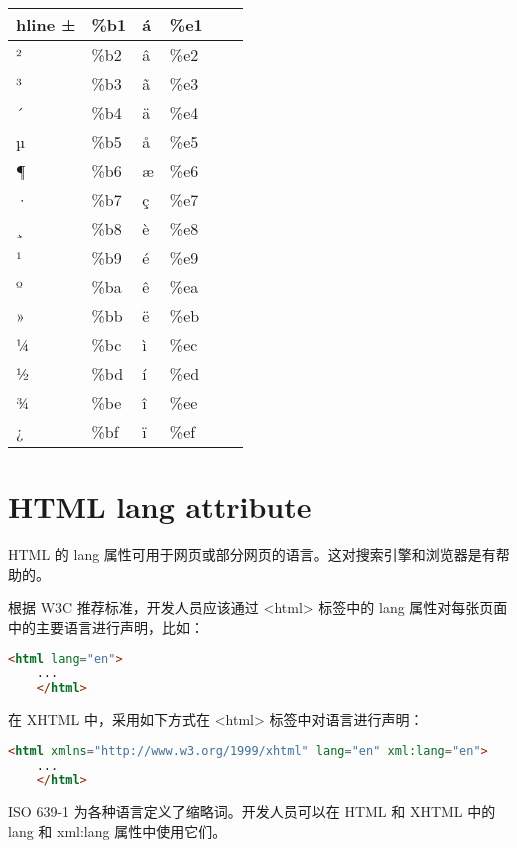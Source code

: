 \begin{longtable}{|l|l|l|l|l|l|}
hline	 	 
±			&\%b1		&á			&\%e1	 	 &			&			\\
\hline
²			&\%b2		&â			&\%e2	 	 &			&			\\
\hline
³			&\%b3		&ã			&\%e3	 	 &			&			\\
\hline
´			&\%b4		&ä			&\%e4		&			&			\\
\hline	 	 
µ			&\%b5		&å			&\%e5	 	 &			&			\\
\hline
¶			&\%b6		&æ			&\%e6		&			&			\\
\hline	 	 
·			&\%b7		&ç			&\%e7	 	 &			&			\\
\hline
¸			&\%b8		&è			&\%e8		&			&			\\
\hline	 	 
¹			&\%b9		&é			&\%e9	 	 &			&			\\
\hline
º			&\%ba		&ê			&\%ea	 	 &			&			\\
\hline
»			&\%bb		&ë			&\%eb	 	 &			&			\\
\hline
¼			&\%bc		&ì			&\%ec	 	 &			&			\\
\hline
½			&\%bd		&í			&\%ed		&			&			\\
\hline 	 
¾			&\%be		&î			&\%ee		&			&			\\
\hline	 	 
¿			&\%bf		&ï			&\%ef		&			&			\\ 	 
\hline
\end{longtable}


\chapter{HTML lang attribute}


HTML 的 lang 属性可用于网页或部分网页的语言。这对搜索引擎和浏览器是有帮助的。

根据 W3C 推荐标准，开发人员应该通过 <html> 标签中的 lang 属性对每张页面中的主要语言进行声明，比如：

\begin{lstlisting}[language=HTML]
    <html lang="en">
    ...
    </html>
\end{lstlisting}



在 XHTML 中，采用如下方式在 <html> 标签中对语言进行声明：

\begin{lstlisting}[language=HTML]
    <html xmlns="http://www.w3.org/1999/xhtml" lang="en" xml:lang="en">
    ...
    </html>
\end{lstlisting}



ISO 639-1 为各种语言定义了缩略词。开发人员可以在 HTML 和 XHTML 中的 lang 和 xml:lang 属性中使用它们。


